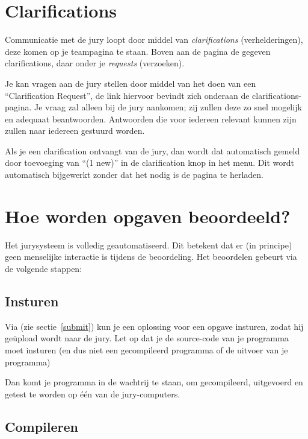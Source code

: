 \section{Clarifications}

Communicatie met de jury loopt door middel van \emph{clarifications}
(verhelderingen), deze komen op je teampagina te staan. Boven aan de
pagina de gegeven clarifications, daar onder je \emph{requests} (verzoeken).

Je kan vragen aan de jury stellen door middel van het doen van een
``Clarification Request'', de link hiervoor bevindt zich onderaan de
clarifications-pagina.  Je vraag zal alleen bij de jury aankomen; zij
zullen deze zo snel mogelijk en adequaat beantwoorden. Antwoorden die
voor iedereen relevant kunnen zijn zullen naar iedereen gestuurd worden.

Als je een clarification ontvangt van de jury, dan wordt dat
automatisch gemeld door toevoeging van ``(1 new)'' in de clarification
knop in het menu. Dit wordt automatisch bijgewerkt zonder dat het nodig
is de pagina te herladen.

\section{Hoe worden opgaven beoordeeld?}

Het \DOMjudge jurysysteem is volledig geautomatiseerd. Dit betekent
dat er (in principe) geen menselijke interactie is tijdens de
beoordeling. Het beoordelen gebeurt via de volgende stappen:

\subsection{Insturen}

Via
(zie sectie~\ref{submit}) kun je een oplossing voor een opgave
insturen, zodat hij ge\"upload wordt naar de jury. Let op dat je de
source-code van je programma moet insturen (en dus niet een
gecompileerd programma of de uitvoer van je programma)

Dan komt je programma in de wachtrij te staan, om gecompileerd,
uitgevoerd en getest te worden op \'e\'en van de jury-computers.

\subsection{Compileren}

